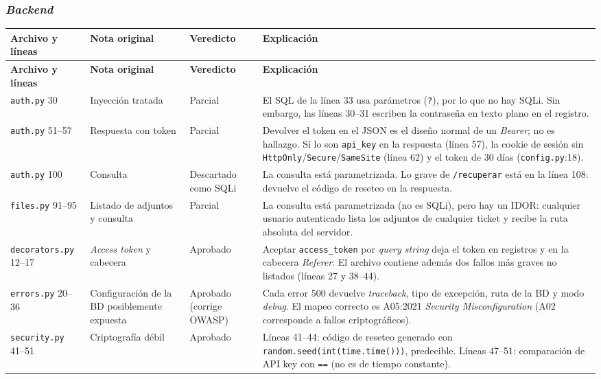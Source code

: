 \documentclass[11pt,letterpaper]{article}
\newcommand{\f}[1]{\texttt{#1}}
\newcommand{\enc}[1]{\textbf{#1}}
\begin{document}
\subsubsection*{\textit{Backend}}
\begin{small}
\begin{longtable}{p{2.9cm}p{2.4cm}p{2.3cm}p{7.6cm}}
\toprule
\enc{Archivo y líneas} & \enc{Nota original} & \enc{Veredicto} & \enc{Explicación} \\
\midrule
\endfirsthead
\toprule
\enc{Archivo y líneas} & \enc{Nota original} & \enc{Veredicto} & \enc{Explicación} \\
\midrule
\endhead
\bottomrule
\endfoot
\f{auth.py} 30 & Inyección tratada & Parcial & El SQL de la línea 33 usa parámetros (\f{?}), por lo que no hay SQLi. Sin embargo, las líneas 30--31 escriben la contraseña en texto plano en el registro. \\
\f{auth.py} 51--57 & Respuesta con token & Parcial & Devolver el token en el JSON es el diseño normal de un \textit{Bearer}; no es hallazgo. Sí lo son \f{api\_key} en la respuesta (línea 57), la cookie de sesión sin \f{HttpOnly}/\f{Secure}/\f{SameSite} (línea 62) y el token de 30 días (\f{config.py}:18). \\
\f{auth.py} 100 & Consulta & Descartado como SQLi & La consulta está parametrizada. Lo grave de \f{/recuperar} está en la línea 108: devuelve el código de reseteo en la respuesta. \\
\f{files.py} 91--95 & Listado de adjuntos y consulta & Parcial & La consulta está parametrizada (no es SQLi), pero hay un IDOR: cualquier usuario autenticado lista los adjuntos de cualquier ticket y recibe la ruta absoluta del servidor. \\
\f{decorators.py} 12--17 & \textit{Access token} y cabecera & Aprobado & Aceptar \f{access\_token} por \textit{query string} deja el token en registros y en la cabecera \textit{Referer}. El archivo contiene además dos fallos más graves no listados (líneas 27 y 38--44). \\
\f{errors.py} 20--36 & Configuración de la BD posiblemente expuesta & Aprobado (corrige OWASP) & Cada error 500 devuelve \textit{traceback}, tipo de excepción, ruta de la BD y modo \textit{debug}. El mapeo correcto es A05:2021 \textit{Security Misconfiguration} (A02 corresponde a fallos criptográficos). \\
\f{security.py} 41--51 & Criptografía débil & Aprobado & Líneas 41--44: código de reseteo generado con \f{random.seed(int(time.time()))}, predecible. Líneas 47--51: comparación de API key con \f{==} (no es de tiempo constante). \\

\end{longtable}
\end{small}
\end{document}
